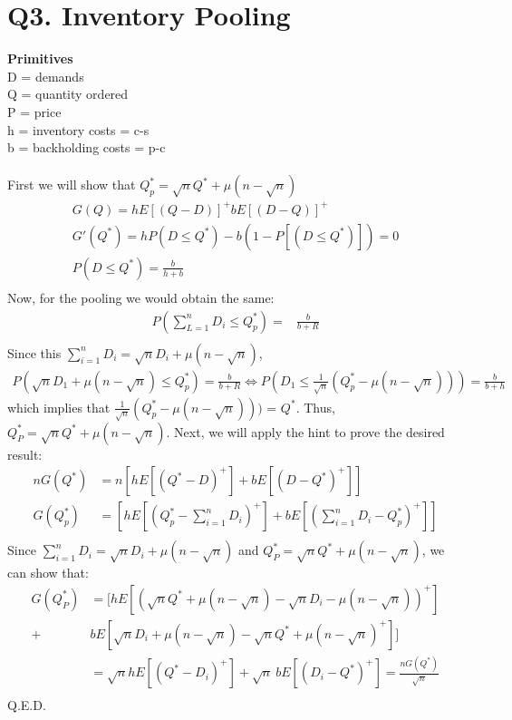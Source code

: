 \documentclass[11pt, english]{article}
\begin{document}
\section{Q3. Inventory Pooling}
\textbf{Primitives}\\ D = demands \\ Q = quantity ordered \\ P = price \\ h =
inventory costs =  c-s \\ b = backholding costs = p-c \\ \\ First we will show that $Q_p^* = \sqrt{n}Q^* + \mu(n- \sqrt{n})$%
\begin{align*} 
G(Q) = hE[(Q-D)]^+bE[(D-Q)]^+ \\ G'(Q^*)= hP(D \leq Q^*) - b(1-P[(D\leq Q^*)]) =
0 \\ P(D \leq Q^*) = \frac{b}{h+b} \\ 
\end{align*}
Now, for the pooling we would obtain the same:
\begin{align*} 
P (\sum_{L= 1}^n D_i \leq Q_p^*) = &  \frac{b}{b+R} \\
\end{align*}
Since  this $\sum_{i = 1}^nD_i = \sqrt{n}D_i+\mu(n-\sqrt{n})$, 
\begin{align*}	
P(\sqrt{n}D_1 + \mu(n - \sqrt{n})\leq Q_p^*) = \frac{b}{b+R}  \Longleftrightarrow P(D_1 \leq
\frac{1}{\sqrt{n}}(Q_p^*- \mu(n-\sqrt{n})))= \frac{b}{b + h} \end{align*} 
which implies that $\frac{1}{\sqrt{n}}(Q_p^*- \mu(n-\sqrt{n})))$ = $Q^*$. Thus, $Q^*_P = \sqrt{n}Q^*+\mu(n-\sqrt{n})$.  Next, we will apply the hint to prove the desired result:
\begin{align*} nG(Q^*) &=
n[hE[(Q^*-D)^+]+bE[(D-Q^*)^+]]\\ G(Q^*_p) & =
[hE[(Q^*_p-\sum_{i=1}^nD_i)^+]+bE[(\sum_{i=1}^nD_i-Q^*_p)^+]]\\ 
\end{align*} 
Since $\sum_{i = 1}^nD_i = \sqrt{n}D_i+\mu(n-\sqrt{n})$ and $Q^*_P = \sqrt{n}Q^*+\mu(n-\sqrt{n})$, we can show that:\\
\begin{align*} 
G(Q^*_P) & =  [hE[(\sqrt{n}Q^*+\mu(n-\sqrt{n})-\sqrt{n}D_i-\mu(n-\sqrt{n}))^+] \\
+& b E[\sqrt{n}D_i+\mu(n-\sqrt{n})-\sqrt{n}Q^*+\mu(n-\sqrt{n})^+]]\\
& = \sqrt{n}hE[(Q^*-D_i)^+] + \sqrt{n} \ b E[(D_i-Q^*)^+] = \frac{nG(Q^*)}{\sqrt{n}}\\ 
\end{align*} 
Q.E.D.\\
\end{document}
